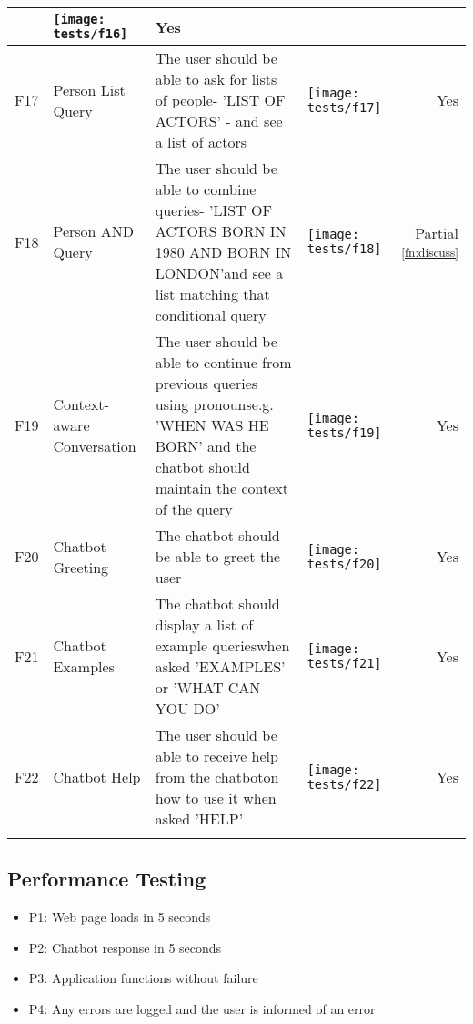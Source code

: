 \begin{landscape}
\begin{tabularx}{\hsize}{lXXXr}
		& \texttt{[image: tests/f16]} & Yes \\
		\midrule
		F17 & Person List Query
		& The user should be able to ask for lists of people\newline - 'LIST OF ACTORS' - and see a list of actors 
		& \texttt{[image: tests/f17]} & Yes \\
		\midrule
		F18 & Person AND Query
		& The user should be able to combine queries\newline - 'LIST OF ACTORS BORN IN 1980 AND BORN IN LONDON'\newline and see a list matching that conditional query
		& \texttt{[image: tests/f18]} & Partial \textsuperscript{\ref{fn:discuss}} \\
		\midrule
		F19 & Context-aware Conversation
		& The user should be able to continue from previous queries using pronouns\newline e.g. 'WHEN WAS HE BORN' and the chatbot should maintain the context of the query
		& \texttt{[image: tests/f19]} & Yes \\
		\midrule
		F20 & Chatbot Greeting
		& The chatbot should be able to greet the user
		& \texttt{[image: tests/f20]} & Yes \\
		\midrule
		F21 & Chatbot Examples
		& The chatbot should display a list of example queries\newline when asked 'EXAMPLES' or 'WHAT CAN YOU DO'
		& \texttt{[image: tests/f21]} & Yes \\
		\midrule
		F22 & Chatbot Help
		& The user should be able to receive help from the chatbot\newline on how to use it when asked 'HELP'
		& \texttt{[image: tests/f22]} & Yes \\
		\bottomrule
		\caption{Requirements testing and evidence}
		\label{tab:testreq}
	\end{tabularx}
\end{landscape}

\newpage
\subsection{Performance Testing}
\begin{itemize}
	\item P1: Web page loads in 5 seconds
	\item P2: Chatbot response in 5 seconds
	\item P3: Application functions without failure
	\item P4: Any errors are logged and the user is informed of an error
\end{itemize}

